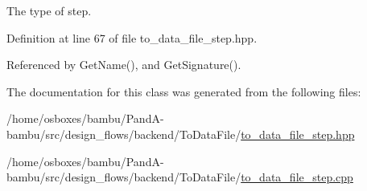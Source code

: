 The type of step. 



Definition at line 67 of file to\+\_\+data\+\_\+file\+\_\+step.\+hpp.



Referenced by Get\+Name(), and Get\+Signature().



The documentation for this class was generated from the following files\+:\begin{DoxyCompactItemize}
\item 
/home/osboxes/bambu/\+Pand\+A-\/bambu/src/design\+\_\+flows/backend/\+To\+Data\+File/\hyperlink{to__data__file__step_8hpp}{to\+\_\+data\+\_\+file\+\_\+step.\+hpp}\item 
/home/osboxes/bambu/\+Pand\+A-\/bambu/src/design\+\_\+flows/backend/\+To\+Data\+File/\hyperlink{to__data__file__step_8cpp}{to\+\_\+data\+\_\+file\+\_\+step.\+cpp}\end{DoxyCompactItemize}
